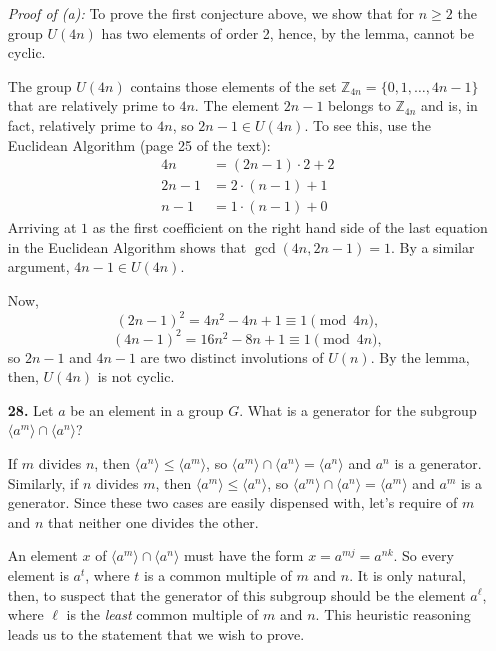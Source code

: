 \documentclass[12pt,reqno]{amsart}
\newcommand{\Z}{\ensuremath{\mathbb{Z}}}
\newcommand{\<}{\ensuremath{\langle}}
\renewcommand{\>}{\ensuremath{\rangle}}
\begin{document}
\begin{enumerate}
\noindent 
{\it Proof of (a):} To prove the first conjecture above, we show that
for $n\geq 2$ the group $U(4n)$ has two elements of order 2, hence, by the
lemma, cannot be cyclic.   

The group $U(4n)$ contains those elements of the set 
$\Z_{4n} = \{0, 1, \dots, 4n-1\}$ that are relatively prime to $4n$.
The element $2n - 1$ belongs to $\Z_{4n}$ and is, in fact, relatively prime to
$4n$, so $2n - 1\in U(4n)$.
To see this, use the Euclidean Algorithm (page 25 of the text):
\begin{align*}
4n &= (2n-1) \cdot 2 + 2\\
2n-1 &= 2\cdot (n-1) + 1\\
n-1 &= 1\cdot (n-1) + 0
\end{align*}
Arriving at $1$ as the first coefficient on the right hand side of the last
equation in the Euclidean Algorithm shows that $\gcd(4n, 2n-1) = 1$.
By a similar argument, $4n-1 \in U(4n)$.  

Now, 
\[
(2n-1)^2 = 4n^2 -4n +1 \equiv 1 \pmod{4n}, 
\]
\[
(4n-1)^2 = 16n^2 -8n +1 \equiv 1 \pmod{4n},
\]
so $2n-1$ and $4n-1$ are two distinct involutions of $U(n)$. By the lemma, then,
$U(4n)$ is not cyclic.



\medskip 


\item[{\bf 28.}]
Let $a$ be an element in a group $G$. What is a generator for the
subgroup $\langle a^m \rangle  \cap  \langle a^n \rangle $?
 
\medskip
{}
If $m$ divides $n$, then $\<a^n\> \leq \<a^m\>$, so
 $\langle a^m \rangle  \cap  \langle a^n \rangle = \<a^n\>$ and 
$a^n$ is a generator.
Similarly, if $n$ divides $m$, then $\<a^m\> \leq \<a^n\>$, so
$\langle a^m \rangle  \cap  \langle a^n \rangle = \<a^m\>$ and 
$a^m$ is a generator.
Since these two cases are easily dispensed with, let's require
of $m$ and $n$ that neither one divides the other. 

An element $x$ of $\langle a^m \rangle  \cap  \langle a^n \rangle $ must have the form
$x = a^{mj} = a^{nk}$.  
So every element is $a^t$, where $t$ is a common multiple of $m$ and $n$.
It is only natural, then, to suspect that the generator of this subgroup should
be the element $a^\ell$, where $\ell$ is the \emph{least} common multiple of $m$
and $n$. This heuristic reasoning leads us to the statement that we wish to prove.


\end{enumerate}
\end{document}
